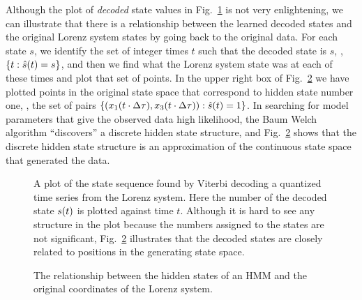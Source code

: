  Although the plot of \emph{decoded} 
 state values in Fig.~\ref{fig:STSintro} is not very enlightening, we
 can illustrate that there is a relationship between the learned
 decoded states and the original Lorenz system states by going back to
 the original data.  For each state $s$, we identify the set of
 integer times $t$ such that the decoded state is $s$, \ie, $\left\{ t
   :{\hat s}{(t)} = s \right\}$, and then we find what the Lorenz
 system state was at each of these times and plot that set of points.
 In the upper right box of Fig.~\ref{fig:Statesintro} we have plotted
 points in the original state space that correspond to hidden state
 number one, \ie, the set of pairs $\left\{
   ({x_1}{(t\cdot\Delta\tau)},{x_3}{(t\cdot\Delta\tau)}) :{\hat
     s}{(t)} = 1 \right\}$.  In searching for model parameters that give
 the observed data high likelihood, the Baum Welch algorithm
 ``discovers'' a discrete hidden state structure, and
 Fig.~\ref{fig:Statesintro} shows that the discrete hidden state
 structure is an approximation of the continuous state space that
 generated the data.
 \begin{figure}[htbp]
   \centering{\plotsize%
     }
   \caption[A plot of a state sequence found by Viterbi decoding.]%
   {A plot of the state sequence found by Viterbi decoding a quantized
     time series from the Lorenz system.  Here the number of the
     decoded state ${s}{(t)}$ is plotted against time $t$.  Although
     it is hard to see any structure in the plot because the numbers
     assigned to the states are not significant,
     Fig.~\ref{fig:Statesintro} illustrates that the decoded states
     are closely related to positions in the generating state space.}
   \label{fig:STSintro}
 \end{figure}
 \begin{figure}[p]
   \caption[Relationship between states of HMM and Lorenz system.]%
   {The relationship between the hidden states of an HMM and the
     original coordinates of the Lorenz system.}
   \label{fig:Statesintro}
 \end{figure}

